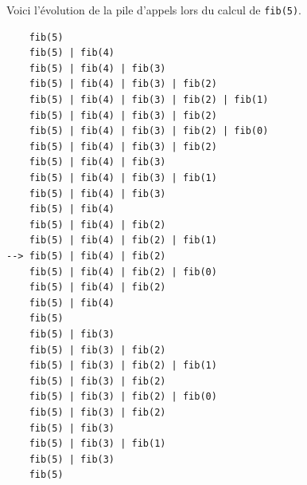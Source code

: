 \documentclass{magnolia}
\begin{document}
\noindent
Voici l'évolution de la pile d'appels lors du calcul de \verb!fib(5)!.

\begin{center}
  \begin{multicols}{2}
\begin{verbatim}
    fib(5)
    fib(5) | fib(4)
    fib(5) | fib(4) | fib(3)
    fib(5) | fib(4) | fib(3) | fib(2)
    fib(5) | fib(4) | fib(3) | fib(2) | fib(1)
    fib(5) | fib(4) | fib(3) | fib(2)
    fib(5) | fib(4) | fib(3) | fib(2) | fib(0)
    fib(5) | fib(4) | fib(3) | fib(2)
    fib(5) | fib(4) | fib(3)
    fib(5) | fib(4) | fib(3) | fib(1)
    fib(5) | fib(4) | fib(3)
    fib(5) | fib(4)
    fib(5) | fib(4) | fib(2)
    fib(5) | fib(4) | fib(2) | fib(1)
--> fib(5) | fib(4) | fib(2)
    fib(5) | fib(4) | fib(2) | fib(0)
    fib(5) | fib(4) | fib(2)
    fib(5) | fib(4)
    fib(5)
    fib(5) | fib(3)
    fib(5) | fib(3) | fib(2)
    fib(5) | fib(3) | fib(2) | fib(1)
    fib(5) | fib(3) | fib(2)
    fib(5) | fib(3) | fib(2) | fib(0)
    fib(5) | fib(3) | fib(2)
    fib(5) | fib(3)
    fib(5) | fib(3) | fib(1)
    fib(5) | fib(3)
    fib(5)
\end{verbatim}
\vspace{3ex}
\end{multicols}
\end{center}
\end{document}
